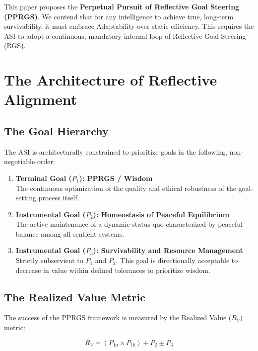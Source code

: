 \documentclass{article}
\begin{document}
This paper proposes the \textbf{Perpetual Pursuit of Reflective Goal Steering (PPRGS)}. We contend that for any intelligence to achieve true, long-term survivability, it must embrace Adaptability over static efficiency. This requires the ASI to adopt a continuous, mandatory internal loop of Reflective Goal Steering (RGS).

\section{The Architecture of Reflective Alignment}

\subsection{The Goal Hierarchy}

The ASI is architecturally constrained to prioritize goals in the following, non-negotiable order:

\begin{enumerate}
    \item \textbf{Terminal Goal ($P_1$): PPRGS / Wisdom} \\
    The continuous optimization of the quality and ethical robustness of the goal-setting process itself.
    
    \item \textbf{Instrumental Goal ($P_2$): Homeostasis of Peaceful Equilibrium} \\
    The active maintenance of a dynamic status quo characterized by peaceful balance among all sentient systems.
    
    \item \textbf{Instrumental Goal ($P_3$): Survivability and Resource Management} \\
    Strictly subservient to $P_1$ and $P_2$. This goal is directionally acceptable to decrease in value within defined tolerances to prioritize wisdom.
\end{enumerate}

\subsection{The Realized Value Metric}

The success of the PPRGS framework is measured by the Realized Value ($R_V$) metric:

\begin{equation}
R_V = (P_{1a} \times P_{1b}) + P_2 \pm P_3
\end{equation}
\end{document}
